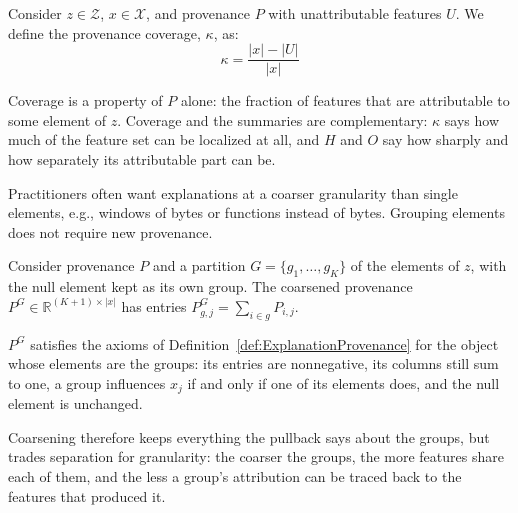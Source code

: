 \label{def:Coverage}
{
Consider $z \in \mathcal{Z}$, $x \in \mathcal{X}$, and provenance $P$ with unattributable features $U$. We define the provenance coverage, $\kappa$, as:
\begin{equation}
    \kappa = \frac{|x| - |U|}{|x|}
\end{equation}
}

Coverage is a property of $P$ alone: the fraction of features that are attributable to some element of $z$. Coverage and the summaries are complementary: $\kappa$ says how much of the feature set can be localized at all, and $H$ and $O$ say how sharply and how separately its attributable part can be.

Practitioners often want explanations at a coarser granularity than single elements, e.g., windows of bytes or functions instead of bytes. Grouping elements does not require new provenance.

\label{def:Coarsening}
{
Consider provenance $P$ and a partition $G = \{g_1, \dots, g_K\}$ of the elements of $z$, with the null element kept as its own group. The coarsened provenance $P^G \in \mathbb{R}^{(K + 1) \times |x|}$ has entries $P^G_{g,j} = \sum_{i \in g} P_{i,j}$.
}

$P^G$ satisfies the axioms of Definition~\ref{def:ExplanationProvenance} for the object whose elements are the groups: its entries are nonnegative, its columns still sum to one, a group influences $x_j$ if and only if one of its elements does, and the null element is unchanged.


Coarsening therefore keeps everything the pullback says about the groups, but trades separation for granularity: the coarser the groups, the more features share each of them, and the less a group's attribution can be traced back to the features that produced it.

